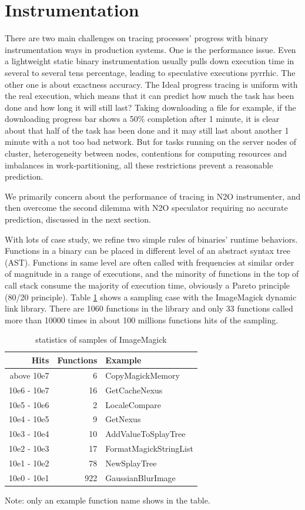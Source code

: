 \section{Instrumentation}

There are two main challenges on tracing processes’ progress with binary instrumentation ways in production systems. One is the performance issue. Even a lightweight static binary instrumentation usually pulls down execution time in several to several tens percentage, leading to speculative executions pyrrhic.  The other one is about exactness accuracy. The Ideal progress tracing is uniform with the real execution, which means that it can predict how much the task has been done and how long it will still last? Taking downloading a file for example, if the downloading progress bar shows a 50\% completion after 1 minute, it is clear about that half of the task has been done and it may still last about another 1 minute with a not too bad network. But for tasks running on the server nodes of cluster, heterogeneity between nodes, contentions for computing resources and imbalances in work-partitioning, all these restrictions prevent a reasonable prediction.

We primarily concern about the performance of tracing in N2O instrumenter, and then overcome the second dilemma with N2O speculator requiring no accurate prediction, discussed in the next section.

With lots of case study, we refine two simple rules of binaries’ runtime behaviors. Functions in a binary can be placed in different level of an abstract syntax tree (AST). Functions in same level are often called with frequencies at similar order of magnitude in a range of executions, and the minority of functions in the top of call stack consume the majority of execution time, obviously a Pareto principle (80/20 principle). Table \ref{table:inst-stats} shows a sampling case with the ImageMagick dynamic link library. There are 1060 functions in the library and only 33 functions called more than 10000 times in about 100 millions functions hits of the sampling.

 \begin{table}[h]
\caption{statistics of samples of ImageMagick}
\label{table:inst-stats}
\begin{center}
\begin{tabular}{r|r|l}
\hline
Hits & Functions & Example \\
\hline
above 10e7 & 6 & CopyMagickMemory \\
10e6 - 10e7 & 16 & GetCacheNexus \\
10e5 - 10e6 & 2 & LocaleCompare \\
10e4 - 10e5 & 9 & GetNexus \\
10e3 - 10e4 & 10 & AddValueToSplayTree \\
10e2 - 10e3 & 17 & FormatMagickStringList \\
10e1 - 10e2 & 78 & NewSplayTree \\
10e0 - 10e1 & 922 & GaussianBlurImage \\
\hline
\end{tabular}
\end{center}
Note: only an example function name shows in the table.
\end{table}

